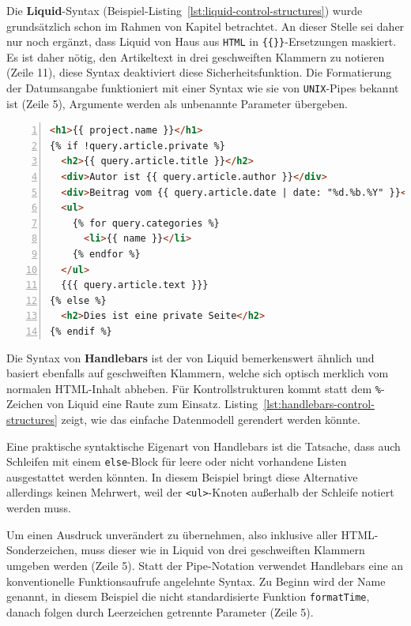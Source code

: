 Die \textbf{Liquid}-Syntax (Beispiel-Listing~\ref{lst:liquid-control-structures}) wurde grundsätzlich schon im Rahmen von Kapitel  betrachtet. An dieser Stelle sei daher nur noch ergänzt, dass Liquid von Haus aus \texttt{HTML} in \texttt{\{\{\}\}}-Ersetzungen maskiert. Es ist daher nötig, den Artikeltext in drei geschweiften Klammern zu notieren (Zeile 11), diese Syntax deaktiviert diese Sicherheitsfunktion. Die Formatierung der Datumsangabe funktioniert mit einer Syntax wie sie von \texttt{UNIX}-Pipes bekannt ist (Zeile 5), Argumente werden als unbenannte Parameter übergeben.

\begin{lstlisting}[float=h, language=HTML, numbers=left, caption={Blogartikel mit Liquid}, label={lst:liquid-control-structures}]
<h1>{{ project.name }}</h1>
{% if !query.article.private %}
  <h2>{{ query.article.title }}</h2>
  <div>Autor ist {{ query.article.author }}</div>
  <div>Beitrag vom {{ query.article.date | date: "%d.%b.%Y" }}</div>
  <ul>
    {% for query.categories %}
      <li>{{ name }}</li>
    {% endfor %}
  </ul>
  {{{ query.article.text }}}
{% else %}
  <h2>Dies ist eine private Seite</h2>
{% endif %}
\end{lstlisting}

Die Syntax von \textbf{Handlebars} ist der von Liquid bemerkenswert ähnlich und basiert ebenfalls auf geschweiften Klammern, welche sich optisch merklich vom normalen HTML-Inhalt abheben. Für Kontrollstrukturen kommt statt dem \texttt{\%}-Zeichen von Liquid eine Raute zum Einsatz. Listing~\ref{lst:handlebars-control-structures} zeigt, wie das einfache Datenmodell gerendert werden könnte.

Eine praktische syntaktische Eigenart von Handlebars ist die Tatsache, dass auch Schleifen mit einem \texttt{else}-Block für leere oder nicht vorhandene Listen ausgestattet werden könnten. In diesem Beispiel bringt diese Alternative allerdings keinen Mehrwert, weil der \texttt{<ul>}-Knoten außerhalb der Schleife notiert werden muss.

Um einen Ausdruck unverändert zu übernehmen, also inklusive aller HTML-Sonderzeichen, muss dieser wie in Liquid von drei geschweiften Klammern umgeben werden (Zeile 5). Statt der Pipe-Notation verwendet Handlebars eine an konventionelle Funktionsaufrufe angelehnte Syntax. Zu Beginn wird der Name genannt, in diesem Beispiel die nicht standardisierte Funktion \texttt{formatTime}, danach folgen durch Leerzeichen getrennte Parameter (Zeile 5).

